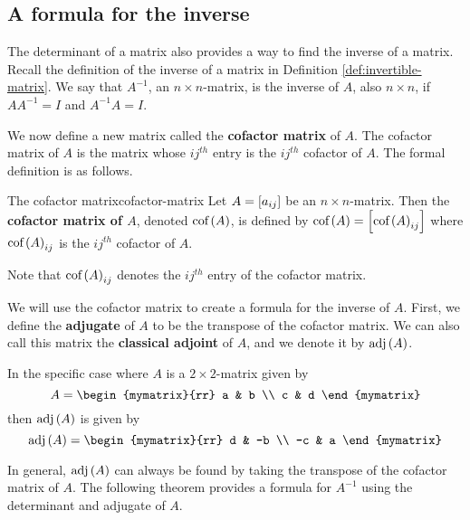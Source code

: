 \subsection{A formula for the inverse}

The determinant of a matrix also provides a way to find the inverse of a matrix.
Recall the definition of the inverse of a matrix in Definition \ref{def:invertible-matrix}.
We say that $A^{-1}$, an $n \times n$-matrix, is the inverse of $A$, also $n \times n$, if $AA^{-1} = I$ and $A^{-1}A=I$. 

We now define a new matrix called the \textbf{cofactor matrix} of $A$.  
The cofactor matrix of $A$ is the matrix whose $ij^{th}$ entry is the $ij^{th}$ cofactor of $A$.
The formal definition is as follows.

\begin{definition}{The cofactor matrix}{cofactor-matrix}
Let $A=\left[a_{ij}\right]$ be an $n\times n$-matrix. Then the
\textbf{cofactor matrix of $A$}, denoted 
$\mbox{\rm cof}\left(A\right)$, is defined by $\mbox{\rm cof}\left(A\right) =\left[
\mbox{\rm cof}\left(A\right)_{ij}\right] $ where  $\mbox{\rm cof}\left(A\right)_{ij}$ is the $ij^{th}$ cofactor of $A$.
\end{definition}

Note that $\mbox{\rm cof}\left(A\right)_{ij}$ denotes the $ij^{th}$ entry of the cofactor matrix.

We will use the cofactor matrix to create a formula for the inverse of $A$. First,
we define the \textbf{adjugate} of $A$ to be the transpose of 
the cofactor matrix. We can also call this matrix the \textbf{classical adjoint} of $A$,
and we denote it by $\mbox{\rm adj} \left(A\right)$. 

In the specific case where $A$ is a $2 \times 2$-matrix given by
\begin{equation*}
A = \begin{mymatrix}{rr}
a & b \\
c & d
\end{mymatrix}
\end{equation*}
then $\mbox{\rm adj}\left(A\right)$ is given by
\begin{equation*}
\func{adj}\tup{A} = 
\begin{mymatrix}{rr}
d & -b \\
-c & a
\end{mymatrix}
\end{equation*}

In general, $\mbox{\rm adj}\left(A\right)$ can always be found by taking the transpose of the cofactor matrix of $A$. The following theorem provides a formula for $A^{-1}$ using the determinant and adjugate of $A$.

